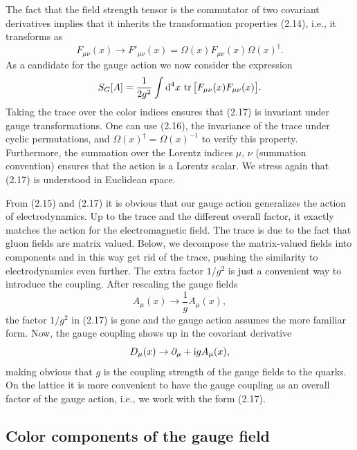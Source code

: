 The fact that the field strength tensor is the commutator of two covariant
derivatives implies that it inherits the transformation properties (2.14),
i.e., it transforms as
\begin{equation}
  F_{\mu\nu}(x) \to F'_{\mu\nu}(x) = \Omega(x) F_{\mu\nu}(x) \Omega(x)^\dagger .
\end{equation}
As a candidate for the gauge action we now consider the expression
\begin{equation}
  S_G[A] = \frac{1}{2 g^2} \int \mathrm{d}^4 x\,
    \operatorname{tr}\big[F_{\mu\nu}(x) F_{\mu\nu}(x)\big] .
\end{equation}
Taking the trace over the color indices ensures that (2.17) is invariant
under gauge transformations. One can use (2.16), the invariance of the trace
under cyclic permutations, and $\Omega(x)^\dagger = \Omega(x)^{-1}$ to
verify this property. Furthermore, the summation over the Lorentz indices
$\mu$, $\nu$ (summation convention) ensures that the action is a Lorentz
scalar. We stress again that (2.17) is understood in Euclidean space.

From (2.15) and (2.17) it is obvious that our gauge action generalizes the
action of electrodynamics. Up to the trace and the different overall factor,
it exactly matches the action for the electromagnetic field. The trace is
due to the fact that gluon fields are matrix valued. Below, we decompose the
matrix-valued fields into components and in this way get rid of the trace,
pushing the similarity to electrodynamics even further. The extra factor
$1/g^2$ is just a convenient way to introduce the coupling. After rescaling
the gauge fields
\begin{equation}
  A_\mu(x) \to \frac{1}{g} A_\mu(x) ,
\end{equation}
the factor $1/g^2$ in (2.17) is gone and the gauge action assumes the more
familiar form. Now, the gauge coupling shows up in the covariant derivative
\begin{equation}
  D_\mu(x) \to \partial_\mu + \mathrm{i} g A_\mu(x) ,
\end{equation}
making obvious that $g$ is the coupling strength of the gauge fields to the
quarks. On the lattice it is more convenient to have the gauge coupling as
an overall factor of the gauge action, i.e., we work with the form (2.17).

\subsection{Color components of the gauge field}

